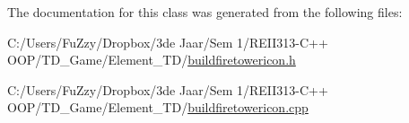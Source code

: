 The documentation for this class was generated from the following files\+:\begin{DoxyCompactItemize}
\item 
C\+:/\+Users/\+Fu\+Zzy/\+Dropbox/3de Jaar/\+Sem 1/\+R\+E\+I\+I313-\/\+C++ O\+O\+P/\+T\+D\+\_\+\+Game/\+Element\+\_\+\+T\+D/\hyperlink{buildfiretowericon_8h}{buildfiretowericon.\+h}\item 
C\+:/\+Users/\+Fu\+Zzy/\+Dropbox/3de Jaar/\+Sem 1/\+R\+E\+I\+I313-\/\+C++ O\+O\+P/\+T\+D\+\_\+\+Game/\+Element\+\_\+\+T\+D/\hyperlink{buildfiretowericon_8cpp}{buildfiretowericon.\+cpp}\end{DoxyCompactItemize}
